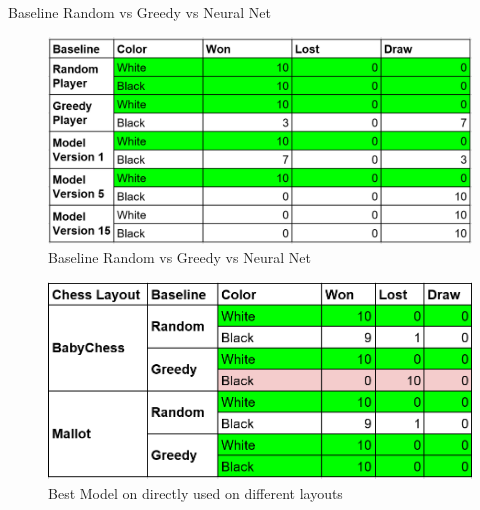 \documentclass[final]{beamer}
\newlength{\onecolwid}
\newlength{\twocolwid}
\begin{document}
\begin{frame}[t]
\begin{columns}[t]
\begin{column}{\twocolwid}
\begin{columns}[t,totalwidth=\twocolwid]
\begin{column}{\onecolwid} %


\begin{block}{Baseline Random vs Greedy vs Neural Net}


\begin{figure}
\includegraphics[width=0.8\linewidth]{baseline.png}
\caption{Baseline Random vs Greedy vs Neural Net}
\end{figure}

\begin{figure}
\includegraphics[width=0.8\linewidth]{diff_layouts.png}
\caption{Best Model on directly used on different layouts}
\end{figure}

\end{block}


\end{column} %

\end{columns} %

\end{column} %


\end{columns}
\end{frame}
\end{document}
